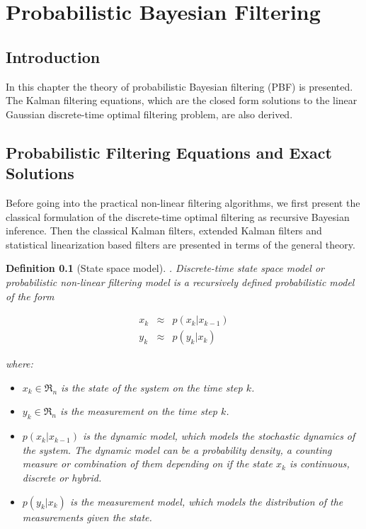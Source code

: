 \chapter*{Probabilistic Bayesian Filtering}
\section{Introduction}
In this chapter the theory of probabilistic Bayesian filtering (PBF) is presented. The Kalman filtering equations, which are the closed form solutions to the linear Gaussian discrete-time optimal filtering problem, are also derived.

\section{Probabilistic Filtering Equations and Exact Solutions}
Before going into the practical non-linear filtering algorithms, we first present the classical formulation of the discrete-time optimal filtering as recursive Bayesian inference. Then the classical Kalman filters, extended Kalman filters and statistical linearization based filters are presented in terms of the general theory. 
\newtheorem {thm}{Definition}[section]

\begin{thm}[State space model]. 
Discrete-time state space model or probabilistic non-linear filtering model is a recursively defined probabilistic model of the form

\begin{eqnarray} \label{eqn: State space model}
x_k & \approx & p(x_k | x_{k-1} ) \nonumber \\
y_k &  \approx & p(y_k | x_k ) 
\end{eqnarray}

where:

\begin{itemize}
\item $x_k \in \Re_{n}$ is the state of the system on the time step $k$.
\item $y_k \in \Re_{n}$ is the measurement on the time step $k$.
\item $p(x_k | x_{k-1})$ is the dynamic model, which models the stochastic dynamics of the system. The dynamic model can be a probability density, a counting measure or combination of them depending on if the state $x_k$ is continuous, discrete or hybrid.
\item $p(y_k | x_k )$ is the measurement model, which models the distribution of the
measurements given the state.
\end{itemize}

\end{thm}


